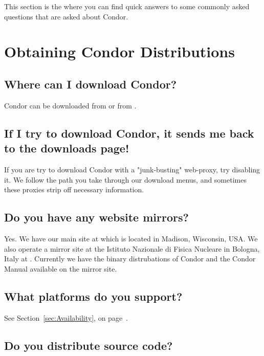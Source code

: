 This section is the where you can find quick answers to some commonly
asked questions that are asked about Condor.

\section{Obtaining Condor Distributions}

\subsection{Where can I download Condor?}

Condor can be downloaded from  or from
.

\subsection{If I try to download Condor, it sends me back to the downloads page!}

If you are try to download Condor with a "junk-busting" web-proxy, try disabling it.
We follow the path you take through our download menus, and sometimes these proxies strip off necessary information.

\subsection{Do you have any website mirrors?}

Yes.  We have our main site at 
which is located in Madison, Wisconsin, USA.  We also operate a mirror
site at the Istituto Nazionale di Fisica Nucleare in Bologna, Italy
at .  Currently we have the 
binary distrubations of Condor and the Condor Manual available on the
mirror site.

\subsection{What platforms do you support?}

See Section~\ref{sec:Availability}, on page~\pageref{sec:Availability}.

\subsection{Do you distribute source code?}

